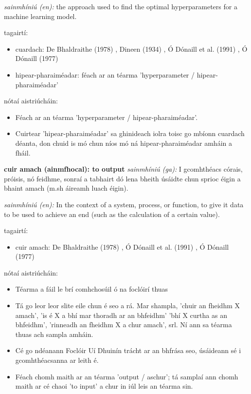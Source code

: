 \documentclass{article}
\begin{document}
\textit{sainmhíniú (en):} the approach used to find the optimal hyperparameters for a machine learning model.

tagairtí:
\begin{itemize}
	\item cuardach: De Bhaldraithe (1978) \cite{de-bhaldraithe}, Dineen (1934) \cite{dineen}, Ó Dónaill et al. (1991) \cite{focloir-beag}, Ó Dónaill (1977) \cite{odonaill}
	\item hipear-pharaiméadar: féach ar an téarma 'hyperparameter / hipear-pharaiméadar'
\end{itemize}

nótaí aistriúcháin:
\begin{itemize}
	\item Féach ar an téarma 'hyperparameter / hipear-pharaiméadar'.
	\item Cuirtear 'hipear-pharaiméadar' sa ghinideach iolra toisc go mbíonn cuardach déanta, don chuid is mó chun níos mó ná hipear-pharaiméadar amháin a fháil.
\end{itemize}


\textbf{cuir amach (ainmfhocal): to output}
\textit{sainmhíniú (ga):} I gcomhthéacs córais, próisis, nó feidhme, sonraí a tabhairt dó lena bheith úsáidte chun sprioc éigin a bhaint amach (m.sh áireamh luach éigin).

\textit{sainmhíniú (en):} In the context of a system, process, or function, to give it data to be used to achieve an end (such as the calculation of a certain value).

tagairtí:
\begin{itemize}
	\item cuir amach: De Bhaldraithe (1978) \cite{de-bhaldraithe}, Ó Dónaill et al. (1991) \cite{focloir-beag}, Ó Dónaill (1977) \cite{odonaill}
\end{itemize}

nótaí aistriúcháin:
\begin{itemize}
	\item Téarma a fáil le brí comhchosúil ó na foclóirí thuas
	\item Tá go leor leor slite eile chun é seo a rá. Mar shampla, 'chuir an fheidhm X amach', 'is é X a bhí mar thoradh ar an bhfeidhm' 'bhí X curtha as an bhfeidhm', 'rinneadh an fheidhm X a chur amach', srl. Ní ann sa téarma thuas ach sampla amháin.
	\item Cé go ndéanann Foclóir Uí Dhuinín trácht ar an bhfrása seo, úsáideann sé i gcomhthéacsanna ar leith é.
	\item Féach chomh maith ar an téarma 'output / aschur'; tá samplaí ann chomh maith ar cé chaoi 'to input' a chur in iúl leis an téarma sin.
\end{itemize}
\end{document}
